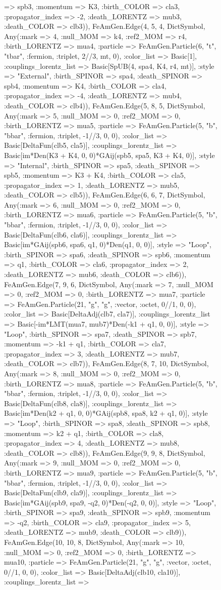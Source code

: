 \documentclass{revtex4}
\begin{document}
\begin{figure}[!htb]
\begin{center}
{=> spb3, :momentum => K3, :birth_COLOR => cla3, :propagator_index => -2, :death_LORENTZ => mub3, :death_COLOR => clb3)), FeAmGen.Edge(4, 5, 4, Dict{Symbol, Any}(:mark => 4, :null_MOM => k4, :ref2_MOM => r4, :birth_LORENTZ => mua4, :particle => FeAmGen.Particle(6, "t", "tbar", :fermion, :triplet, 2//3, mt, 0), :color_list => Basic[1], :couplings_lorentz_list => Basic[SpUB(4, spa4, K4, r4, mt)], :style => "External", :birth_SPINOR => spa4, :death_SPINOR => spb4, :momentum => K4, :birth_COLOR => cla4, :propagator_index => -4, :death_LORENTZ => mub4, :death_COLOR => clb4)), FeAmGen.Edge(5, 8, 5, Dict{Symbol, Any}(:mark => 5, :null_MOM => 0, :ref2_MOM => 0, :birth_LORENTZ => mua5, :particle => FeAmGen.Particle(5, "b", "bbar", :fermion, :triplet, -1//3, 0, 0), :color_list => Basic[DeltaFun(clb5, cla5)], :couplings_lorentz_list => Basic[im*Den(K3 + K4, 0, 0)*GAij(spb5, spa5, K3 + K4, 0)], :style => "Internal", :birth_SPINOR => spa5, :death_SPINOR => spb5, :momentum => K3 + K4, :birth_COLOR => cla5, :propagator_index => 1, :death_LORENTZ => mub5, :death_COLOR => clb5)), FeAmGen.Edge(6, 6, 7, Dict{Symbol, Any}(:mark => 6, :null_MOM => 0, :ref2_MOM => 0, :birth_LORENTZ => mua6, :particle => FeAmGen.Particle(5, "b", "bbar", :fermion, :triplet, -1//3, 0, 0), :color_list => Basic[DeltaFun(clb6, cla6)], :couplings_lorentz_list => Basic[im*GAij(spb6, spa6, q1, 0)*Den(q1, 0, 0)], :style => "Loop", :birth_SPINOR => spa6, :death_SPINOR => spb6, :momentum => q1, :birth_COLOR => cla6, :propagator_index => 2, :death_LORENTZ => mub6, :death_COLOR => clb6)), FeAmGen.Edge(7, 9, 6, Dict{Symbol, Any}(:mark => 7, :null_MOM => 0, :ref2_MOM => 0, :birth_LORENTZ => mua7, :particle => FeAmGen.Particle(21, "g", "g", :vector, :octet, 0//1, 0, 0), :color_list => Basic[DeltaAdj(clb7, cla7)], :couplings_lorentz_list => Basic[-im*LMT(mua7, mub7)*Den(-k1 + q1, 0, 0)], :style => "Loop", :birth_SPINOR => spa7, :death_SPINOR => spb7, :momentum => -k1 + q1, :birth_COLOR => cla7, :propagator_index => 3, :death_LORENTZ => mub7, :death_COLOR => clb7)), FeAmGen.Edge(8, 7, 10, Dict{Symbol, Any}(:mark => 8, :null_MOM => 0, :ref2_MOM => 0, :birth_LORENTZ => mua8, :particle => FeAmGen.Particle(5, "b", "bbar", :fermion, :triplet, -1//3, 0, 0), :color_list => Basic[DeltaFun(clb8, cla8)], :couplings_lorentz_list => Basic[im*Den(k2 + q1, 0, 0)*GAij(spb8, spa8, k2 + q1, 0)], :style => "Loop", :birth_SPINOR => spa8, :death_SPINOR => spb8, :momentum => k2 + q1, :birth_COLOR => cla8, :propagator_index => 4, :death_LORENTZ => mub8, :death_COLOR => clb8)), FeAmGen.Edge(9, 9, 8, Dict{Symbol, Any}(:mark => 9, :null_MOM => 0, :ref2_MOM => 0, :birth_LORENTZ => mua9, :particle => FeAmGen.Particle(5, "b", "bbar", :fermion, :triplet, -1//3, 0, 0), :color_list => Basic[DeltaFun(clb9, cla9)], :couplings_lorentz_list => Basic[im*GAij(spb9, spa9, -q2, 0)*Den(-q2, 0, 0)], :style => "Loop", :birth_SPINOR => spa9, :death_SPINOR => spb9, :momentum => -q2, :birth_COLOR => cla9, :propagator_index => 5, :death_LORENTZ => mub9, :death_COLOR => clb9)), FeAmGen.Edge(10, 10, 8, Dict{Symbol, Any}(:mark => 10, :null_MOM => 0, :ref2_MOM => 0, :birth_LORENTZ => mua10, :particle => FeAmGen.Particle(21, "g", "g", :vector, :octet, 0//1, 0, 0), :color_list => Basic[DeltaAdj(clb10, cla10)], :couplings_lorentz_list => }
\end{center}
\end{figure}
\end{document}
